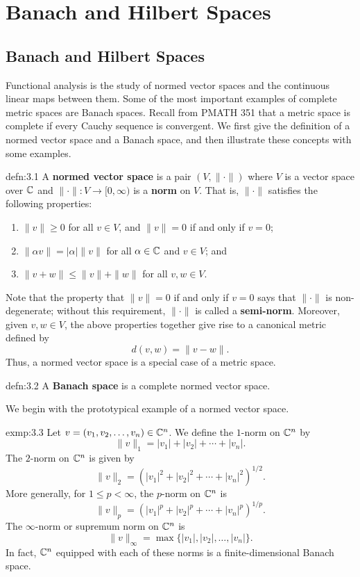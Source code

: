 \section{Banach and Hilbert Spaces}\label{sec:3}

\subsection{Banach and Hilbert Spaces}\label{subsec:3.1}
Functional analysis is the study of normed vector spaces and the continuous 
linear maps between them. Some of the most important examples of complete 
metric spaces are Banach spaces. Recall from PMATH 351 that a metric space is 
complete if every Cauchy sequence is convergent. We first give the definition 
of a normed vector space and a Banach space, and then illustrate these concepts 
with some examples. 

\begin{defn}{defn:3.1}
    A {\bf normed vector space} is a pair $(V, \|\cdot\|)$ where $V$ is a 
    vector space over $\mathbb{C}$ and $\|\cdot\| : V \to [0, \infty)$ is a 
    {\bf norm} on $V$. That is, $\|\cdot\|$ satisfies the following properties: 
    \begin{enumerate}[(1)]
        \item $\|v\| \geq 0$ for all $v \in V$, and $\|v\| = 0$ 
        if and only if $v = 0$; 
        \item $\|\alpha v\| = |\alpha|\|v\|$ for all $\alpha \in \mathbb{C}$ and 
        $v \in V$; and 
        \item $\|v + w\| \leq \|v\| + \|w\|$ for all $v, w \in V$. 
    \end{enumerate}
\end{defn}

Note that the property that $\|v\| = 0$ if and only if $v = 0$ says that 
$\|\cdot\|$ is non-degenerate; without this requirement, $\|\cdot\|$ is 
called a {\bf semi-norm}. Moreover, given $v, w \in V$, the above properties 
together give rise to a canonical metric defined by 
\[ d(v, w) = \|v - w\|. \]
Thus, a normed vector space is a special case of a metric space. 

\begin{defn}{defn:3.2}
    A {\bf Banach space} is a complete normed vector space. 
\end{defn}

We begin with the prototypical example of a normed vector space. 

\begin{exmp}{exmp:3.3} 
    Let $v = (v_1, v_2, \dots, v_n) \in \mathbb{C}^n$. We define the $1$-norm on $\mathbb{C}^n$ by 
    \[ \|v\|_1 = |v_1| + |v_2| + \cdots + |v_n|. \] 
    The $2$-norm on $\mathbb{C}^n$ is given by 
    \[ \|v\|_2 = (|v_1|^2 + |v_2|^2 + \cdots + |v_n|^2)^{1/2}. \] 
    More generally, for $1 \leq p < \infty$, the $p$-norm on $\mathbb{C}^n$ is 
    \[ \|v\|_p = (|v_1|^p + |v_2|^p + \cdots + |v_n|^p)^{1/p}. \] 
    The $\infty$-norm or supremum norm on $\mathbb{C}^n$ is 
    \[ \|v\|_\infty = \max\{|v_1|, |v_2|, \dots, |v_n|\}. \] 
    In fact, $\mathbb{C}^n$ equipped with each of these norms is a finite-dimensional 
    Banach space. 
\end{exmp}


